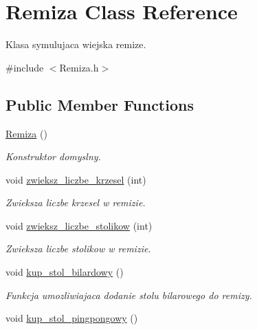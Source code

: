 \hypertarget{class_remiza}{}\section{Remiza Class Reference}
\label{class_remiza}


Klasa symulujaca wiejska remize.  




{\ttfamily \#include $<$Remiza.\+h$>$}

\subsection*{Public Member Functions}
\begin{DoxyCompactItemize}
\item 
\hypertarget{class_remiza_aa2bef7d6f557eb6bc9bc4365d7713bca}{}\hyperlink{class_remiza_aa2bef7d6f557eb6bc9bc4365d7713bca}{Remiza} ()\label{class_remiza_aa2bef7d6f557eb6bc9bc4365d7713bca}

\begin{DoxyCompactList}\small\item\em Konstruktor domyslny. \end{DoxyCompactList}\item 
void \hyperlink{class_remiza_a6c03e80da0f29066b0a441df5acc9b74}{zwieksz\+\_\+liczbe\+\_\+krzesel} (int)
\begin{DoxyCompactList}\small\item\em Zwieksza liczbe krzesel w remizie. \end{DoxyCompactList}\item 
void \hyperlink{class_remiza_a1c60448ce04370e2205263bd712b4751}{zwieksz\+\_\+liczbe\+\_\+stolikow} (int)
\begin{DoxyCompactList}\small\item\em Zwieksza liczbe stolikow w remizie. \end{DoxyCompactList}\item 
\hypertarget{class_remiza_abe72d8ccb83ad8d6cf92e16f45c6f002}{}void \hyperlink{class_remiza_abe72d8ccb83ad8d6cf92e16f45c6f002}{kup\+\_\+stol\+\_\+bilardowy} ()\label{class_remiza_abe72d8ccb83ad8d6cf92e16f45c6f002}

\begin{DoxyCompactList}\small\item\em Funkcja umozliwiajaca dodanie stolu bilarowego do remizy. \end{DoxyCompactList}\item 
\hypertarget{class_remiza_aac18782e8f1117238858db4d5f21cd50}{}void \hyperlink{class_remiza_aac18782e8f1117238858db4d5f21cd50}{kup\+\_\+stol\+\_\+pingpongowy} ()\label{class_remiza_aac18782e8f1117238858db4d5f21cd50}


\end{DoxyCompactItemize}
